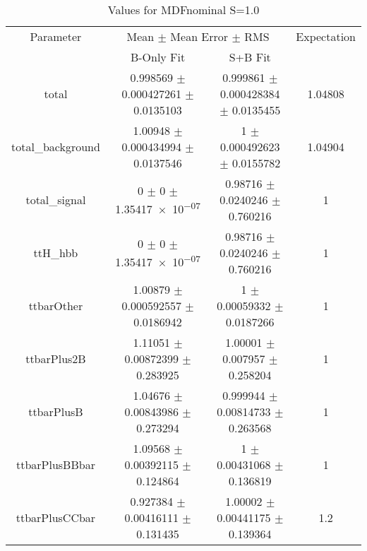 \begin{table}
\centering
\caption{Values for MDFnominal S=1.0}
\begin{tabular}{cccc}
\toprule
Parameter & \multicolumn{2}{c}{Mean $\pm$ Mean Error $\pm$ RMS} & Expectation\\
 & B-Only Fit & S+B Fit & \\
\midrule
total & \num{0.998569} $\pm$ \num{0.000427261} $\pm$ \num{0.0135103} & \num{0.999861} $\pm$ \num{0.000428384} $\pm$ \num{0.0135455} & \num{1.04808}\\
total\_background & \num{1.00948} $\pm$ \num{0.000434994} $\pm$ \num{0.0137546} & \num{1} $\pm$ \num{0.000492623} $\pm$ \num{0.0155782} & \num{1.04904}\\
total\_signal & \num{0} $\pm$ \num{0} $\pm$ \num{1.35417e-07} & \num{0.98716} $\pm$ \num{0.0240246} $\pm$ \num{0.760216} & \num{1}\\
ttH\_hbb & \num{0} $\pm$ \num{0} $\pm$ \num{1.35417e-07} & \num{0.98716} $\pm$ \num{0.0240246} $\pm$ \num{0.760216} & \num{1}\\
ttbarOther & \num{1.00879} $\pm$ \num{0.000592557} $\pm$ \num{0.0186942} & \num{1} $\pm$ \num{0.00059332} $\pm$ \num{0.0187266} & \num{1}\\
ttbarPlus2B & \num{1.11051} $\pm$ \num{0.00872399} $\pm$ \num{0.283925} & \num{1.00001} $\pm$ \num{0.007957} $\pm$ \num{0.258204} & \num{1}\\
ttbarPlusB & \num{1.04676} $\pm$ \num{0.00843986} $\pm$ \num{0.273294} & \num{0.999944} $\pm$ \num{0.00814733} $\pm$ \num{0.263568} & \num{1}\\
ttbarPlusBBbar & \num{1.09568} $\pm$ \num{0.00392115} $\pm$ \num{0.124864} & \num{1} $\pm$ \num{0.00431068} $\pm$ \num{0.136819} & \num{1}\\
ttbarPlusCCbar & \num{0.927384} $\pm$ \num{0.00416111} $\pm$ \num{0.131435} & \num{1.00002} $\pm$ \num{0.00441175} $\pm$ \num{0.139364} & \num{1.2}\\
\bottomrule
\end{tabular}
\end{table}